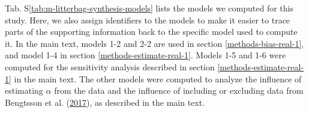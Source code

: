 \documentclass[
  12pt,
]{article}
\begin{document}
Tab. S\ref{tab:m-litterbag-synthesis-models} lists the models we computed for this study. Here, we also assign identifiers to the models to make it easier to trace parts of the supporting information back to the specific model used to compute it. In the main text, models 1-2 and 2-2 are used in section \ref{methods-bias-real-1}, and model 1-4 in section \ref{methods-estimate-real-1}. Models 1-5 and 1-6 were computed for the sensitivity analysis described in section \ref{methods-estimate-real-1} in the main text. The other models were computed to analyze the influence of estimating \(\alpha\) from the data and the influence of including or excluding data from Bengtsson et al. (\protect\hyperlink{ref-Bengtsson.2017}{2017}), as described in the main text.
\end{document}
